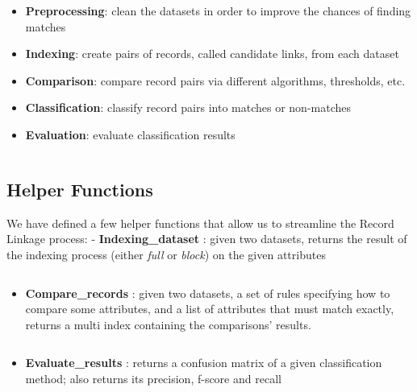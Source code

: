 \documentclass{article}
\providecommand{\tightlist}{%
      \setlength{\itemsep}{0pt}\setlength{\parskip}{0pt}}
\begin{document}
\begin{itemize}
\tightlist
\item
  \textbf{Preprocessing}: clean the datasets in order to improve the
  chances of finding matches
\item
  \textbf{Indexing}: create pairs of records, called candidate links,
  from each dataset
\item
  \textbf{Comparison}: compare record pairs via different algorithms,
  thresholds, etc.
\item
  \textbf{Classification}: classify record pairs into matches or
  non-matches
\item
  \textbf{Evaluation}: evaluate classification results
\end{itemize}

    \begin{Verbatim}[commandchars=\\\{\}]

\end{Verbatim}

    \hypertarget{helper-functions}{%
\subsection{Helper Functions}\label{helper-functions}}

We have defined a few helper functions that allow us to streamline the
Record Linkage process: - \textbf{Indexing\_dataset} : given two
datasets, returns the result of the indexing process (either \emph{full}
or \emph{block}) on the given attributes

    \begin{Verbatim}[commandchars=\\\{\}]

\end{Verbatim}

    \begin{itemize}
\tightlist
\item
  \textbf{Compare\_records} : given two datasets, a set of rules
  specifying how to compare some attributes, and a list of attributes
  that must match exactly, returns a multi index containing the
  comparisons' results.
\end{itemize}

    \begin{Verbatim}[commandchars=\\\{\}]

\end{Verbatim}

    \begin{itemize}
\tightlist
\item
  \textbf{Evaluate\_results} : returns a confusion matrix of a given
  classification method; also returns its precision, f-score and recall
\end{itemize}
\end{document}
